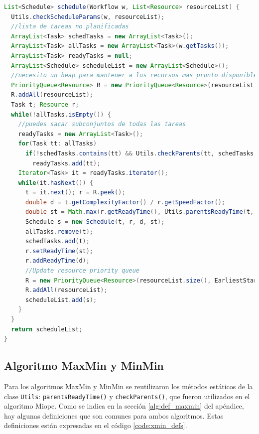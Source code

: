 \begin{lstlisting}[language=java,label={code:myopic},caption={Algoritmo Miope},float]
List<Schedule> schedule(Workflow w, List<Resource> resourceList) {
  Utils.checkScheduleParams(w, resourceList);
  //lista de tareas no planificadas
  ArrayList<Task> schedTasks = new ArrayList<Task>();
  ArrayList<Task> allTasks = new ArrayList<Task>(w.getTasks());
  ArrayList<Task> readyTasks = null;
  ArrayList<Schedule> scheduleList = new ArrayList<Schedule>();
  //necesito un heap para mantener a los recursos mas pronto disponibles
  PriorityQueue<Resource> R = new PriorityQueue<Resource>(resourceList.size(), EarliestStartTimeComparator.getComp());
  R.addAll(resourceList);
  Task t; Resource r;
  while(!allTasks.isEmpty()) {
    //puedes sacar subconjuntos de todas las tareas
    readyTasks = new ArrayList<Task>();
    for(Task tt: allTasks)
      if(!schedTasks.contains(tt) && Utils.checkParents(tt, schedTasks, w))
        readyTasks.add(tt);
    Iterator<Task> it = readyTasks.iterator();
    while(it.hasNext()) {
      t = it.next(); r = R.peek();
      double d = t.getComplexityFactor() / r.getSpeedFactor();
      double st = Math.max(r.getReadyTime(), Utils.parentsReadyTime(t, scheduleList, w));
      Schedule s = new Schedule(t, r, d, st);
      allTasks.remove(t);
      schedTasks.add(t);
      r.setReadyTime(st);
      r.addReadyTime(d);
      //Update resource priority queue
      R = new PriorityQueue<Resource>(resourceList.size(), EarliestStartTimeComparator.getComp());
      R.addAll(resourceList);
      scheduleList.add(s);
    }
  }
  return scheduleList;
}
\end{lstlisting}

\subsection{Algoritmo MaxMin y MinMin}
Para los algoritmos MaxMin y MinMin se reutilizaron los métodos estáticos de la clase \texttt{Utils}: \texttt{parentsReadyTime()} y \texttt{checkParents()}, que fueron utilizados en el algoritmo Miope. Como se indica en la sección \ref{alg:def_maxmin} del apéndice, hay algunas definiciones que son comunes para ambos algoritmos. Estas definiciones están expresadas en el código \ref{code:xmin_defs}.

